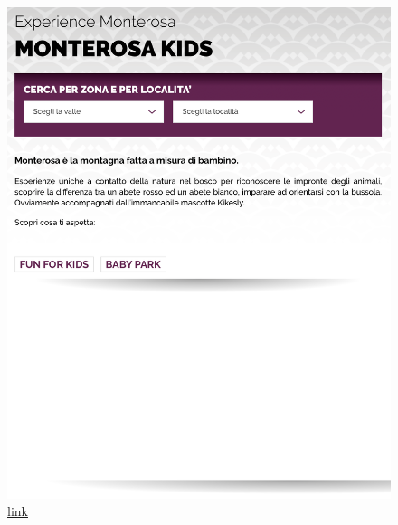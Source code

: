 \documentclass[a4paper, 11pt, parskip=half, headsepline]{scrreprt}
\begin{document}
\begin{figure}[H]
\begin{minipage}[t]{0.5\textwidth}
        \includegraphics[width=1\linewidth, keepaspectratio]{12-interaction-consistency}
        \caption{\href{https://www.visitmonterosa.com/experience-monterosa/famigliare/}{link}}
        \label{fig:interaction-consistency-02}
    \end{minipage} 
\end{figure}
\end{document}
